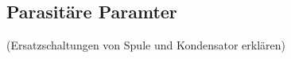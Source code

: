 \subsection{Parasitäre Paramter}\label{subsec:parasitparam}
(Ersatzschaltungen von Spule und Kondensator erklären)